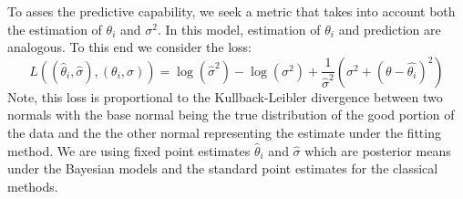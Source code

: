 \documentclass[ba]{imsart}
\newcommand{\by}{\mbox{\boldmath $y$}}
\newcommand{\response}[1]{{\color{blue}#1}}
\begin{document}
\response{To asses the predictive capability, we seek a metric that takes into account both the estimation of $\theta_{i}$ and $\sigma^{2}$. In this model, estimation of $\theta_{i}$ and prediction are analogous. To this end we consider the loss:
\begin{equation}
\label{sim1loss}
L((\hat\theta_{i}, \hat\sigma), (\theta_{i},\sigma)) =
\log(\hat\sigma^{2}) - \log(\sigma^{2}) + \frac{1}{\hat\sigma^{2}}(\sigma^{2} + (\theta - \hat{\theta_{i}})^{2})
\end{equation}
Note, this loss is proportional to the Kullback-Leibler divergence between two normals with the base normal being the true distribution of the good portion of the data and the the other normal representing the estimate under the fitting method. We are using fixed point estimates $\hat\theta_{i}$ and $\hat\sigma$ which are posterior means under the Bayesian models and the standard point estimates for the classical methods.
}
\end{document}
